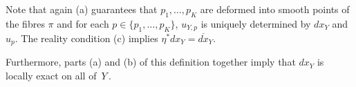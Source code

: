 \documentclass[11pt,twoside]{amsart}
\theoremstyle{plain}
\newcommand{\Sh}[1]{\mathcal{#1}} %
\newcommand{\dfx}{dx}
\begin{document}
Note that again (a) guarantees that $p_1,\ldots,p_K$ are deformed into smooth points of the fibres $\pi$ and for each $p\in\{p_1,\ldots,p_K\}$, $u_{Y,p}$ is uniquely determined by $\dfx_Y$ and $u_p$. The reality condition (c) implies $\eta^\ast \dfx_Y=\overline{\dfx}_Y$.

Furthermore, parts (a) and (b) of this definition together imply that $\dfx_Y$ is locally exact on all of \,$Y$\,. 
% 
\end{document}
